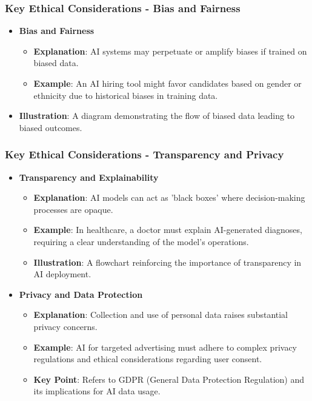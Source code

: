 \documentclass[aspectratio=169]{beamer}
\begin{document}
\begin{frame}[fragile]
    \frametitle{Key Ethical Considerations - Bias and Fairness}
    \begin{itemize}
        \item \textbf{Bias and Fairness}
        \begin{itemize}
            \item \textbf{Explanation}: AI systems may perpetuate or amplify biases if trained on biased data.
            \item \textbf{Example}: An AI hiring tool might favor candidates based on gender or ethnicity due to historical biases in training data.
        \end{itemize}
        \item \textbf{Illustration}: A diagram demonstrating the flow of biased data leading to biased outcomes.
    \end{itemize}
\end{frame}

\begin{frame}[fragile]
    \frametitle{Key Ethical Considerations - Transparency and Privacy}
    \begin{itemize}
        \item \textbf{Transparency and Explainability}
        \begin{itemize}
            \item \textbf{Explanation}: AI models can act as 'black boxes' where decision-making processes are opaque.
            \item \textbf{Example}: In healthcare, a doctor must explain AI-generated diagnoses, requiring a clear understanding of the model’s operations.
            \item \textbf{Illustration}: A flowchart reinforcing the importance of transparency in AI deployment.
        \end{itemize}
        \item \textbf{Privacy and Data Protection}
        \begin{itemize}
            \item \textbf{Explanation}: Collection and use of personal data raises substantial privacy concerns.
            \item \textbf{Example}: AI for targeted advertising must adhere to complex privacy regulations and ethical considerations regarding user consent.
            \item \textbf{Key Point}: Refers to GDPR (General Data Protection Regulation) and its implications for AI data usage.
        \end{itemize}
    \end{itemize}
\end{frame}
\end{document}
